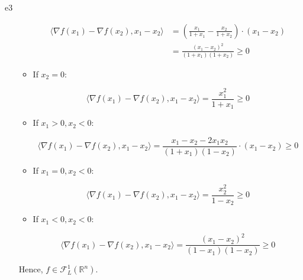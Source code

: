 \documentclass{article}
\begin{document}
\begin{PROOF}{e3}
\begin{enumerate}
\begin{itemize}
		\[
		\begin{split}
		\langle \nabla f(x_1) - \nabla f(x_2), x_1 - x_2 \rangle &= \left( \frac{x_1}{1 + x_1} - \frac{x_2}{1 + x_2} \right) \cdot (x_1 - x_2) \\
		&= \frac{(x_1 - x_2)^2}{(1 + x_1)(1 + x_2)} \geq 0
		\end{split}
		\]
		
		\item If \(x_2 = 0\):
		
		\[
		\langle \nabla f(x_1) - \nabla f(x_2), x_1 - x_2 \rangle = \frac{x_1^2}{1 + x_1} \geq 0
		\]
		
		\item If \(x_1 > 0, x_2 < 0\):
		
		\[
		\langle \nabla f(x_1) - \nabla f(x_2), x_1 - x_2 \rangle = \frac{x_1 - x_2 - 2x_1 x_2}{(1 + x_1)(1 - x_2)} \cdot (x_1 - x_2) \geq 0
		\]
		
		\item If \(x_1 = 0, x_2 < 0\):
		
		\[
		\langle \nabla f(x_1) - \nabla f(x_2), x_1 - x_2 \rangle = \frac{x_2^2}{1 - x_2} \geq 0
		\]
		
		\item If \(x_1 < 0, x_2 < 0\):
		
		\[
		\langle \nabla f(x_1) - \nabla f(x_2), x_1 - x_2 \rangle = \frac{(x_1 - x_2)^2}{(1 - x_1)(1 - x_2)} \geq 0
		\]
	\end{itemize}
	Hence, \(f \in \mathcal{F}_{L}^1(\mathbb{R}^n)\).
\end{enumerate}
\end{PROOF}
\end{document}
